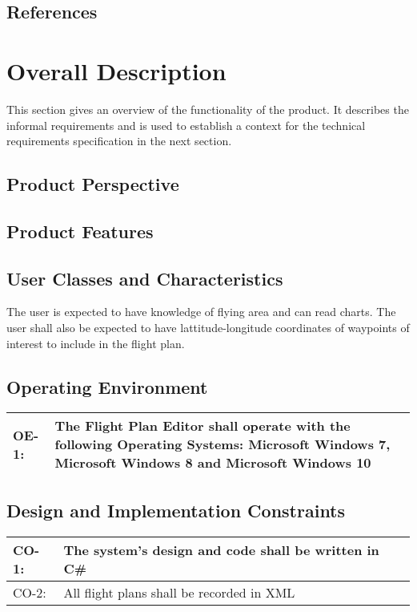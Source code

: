 \documentclass[12pt, letterpaper]{article}
\begin{document}
  \subsection{References}

\section{Overall Description}
  This section gives an overview of the functionality of the product.
  It describes the informal requirements and is used to establish a context for the technical
  requirements specification in the next section.
\subsection{Product Perspective}
  \subsection{Product Features}

  \subsection{User Classes and Characteristics}
    The user is expected to have knowledge of flying area and can read charts.
    The user shall also be expected to have lattitude-longitude coordinates of 
    waypoints of interest to include in the flight plan.
  \subsection{Operating Environment}
    \begin{tabularx}{\textwidth}{|l|X|}
      \hline
      OE-1: & The Flight Plan Editor shall operate with the following Operating Systems: 
              Microsoft Windows 7, Microsoft Windows 8 and Microsoft Windows 10\\
      \hline
    \end{tabularx}
  \subsection{Design and Implementation Constraints}
    \begin{tabularx}{\textwidth}{|l|X|}
      \hline
      CO-1: & The system's design and code shall be written in C\#\\ \hline
      CO-2: & All flight plans shall be recorded in XML\\
      \hline
    \end{tabularx}
\end{document}
